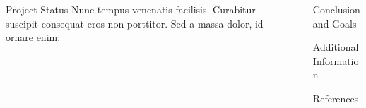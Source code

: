 \documentclass[final]{beamer}
\newlength{\sepwid}
\newlength{\onecolwid}
\newlength{\twocolwid}
\begin{document}
\begin{frame}[t]
\begin{columns}[t]
\begin{column}{\twocolwid}
\begin{columns}[t,totalwidth=\twocolwid]
\begin{column}{\onecolwid}
\begin{block}{Project Status}
Nunc tempus venenatis facilisis. Curabitur suscipit consequat eros non porttitor. Sed a massa dolor, id ornare enim:

\end{block}


\end{column} %

\end{columns} %

\end{column}

\begin{column}{\sepwid}\end{column} %


\begin{column}{\onecolwid} %


\begin{block}{Conclusion and Goals}

\end{block}


\begin{block}{Additional Information}


\end{block}


\begin{block}{References}

\nocite{*} %
\small{
\vspace{0.75in}}

\end{block}



\end{column}
\end{columns}
\end{frame}
\end{document}

